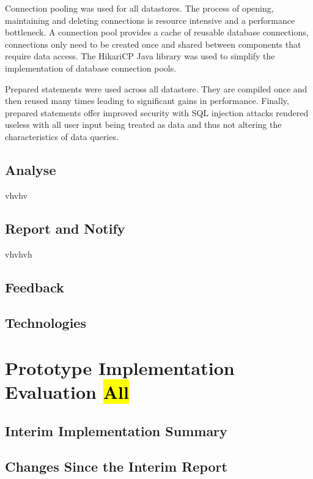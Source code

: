 \documentclass[10pt,a4paper]{article}
\begin{document}
Connection pooling was used for all datastores. The process of opening, maintaining and deleting connections is resource intensive and a performance bottleneck. A connection pool provides a cache of reusable database connections, connections only need to be created once and shared between components that require data access. The HikariCP Java library was used to simplify the implementation of database connection pools. 

Prepared statements were used across all datastore. They are compiled once and then reused many times leading to significant gains in performance. Finally, prepared statements offer improved security with SQL injection attacks rendered useless with all user input being treated as data and thus not altering the characteristics of data queries.

\subsection{Analyse}
\label{sec:analyse}
vhvhv

\subsection{Report and Notify}
\label{sec:report}
vhvhvh

\subsection{Feedback}
\label{sec:feedback}

\subsection{Technologies}

\section{Prototype Implementation Evaluation \hl{All}}
\label{sec:prototype}


\subsection{Interim Implementation Summary}
\label{sec:interim_summary}


\subsection{Changes Since the Interim Report}
\label{sec:changes}
\end{document}
